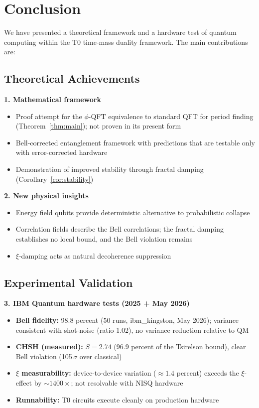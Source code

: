 \section{Conclusion}

We have presented a theoretical framework and a hardware test of quantum computing within the T0 time-mass duality framework. The main contributions are:

\subsection{Theoretical Achievements}

\textbf{1. Mathematical framework}
\begin{itemize}
	\item Proof attempt for the $\phi$-QFT equivalence to standard QFT for period finding (Theorem~\ref{thm:main}); not proven in its present form
	\item Bell-corrected entanglement framework with predictions that are testable only with error-corrected hardware
	\item Demonstration of improved stability through fractal damping (Corollary~\ref{cor:stability})
\end{itemize}

\textbf{2. New physical insights}
\begin{itemize}
	\item Energy field qubits provide deterministic alternative to probabilistic collapse
	\item Correlation fields describe the Bell correlations; the fractal damping establishes no local bound, and the Bell violation remains
	\item $\xi$-damping acts as natural decoherence suppression
\end{itemize}

\subsection{Experimental Validation}

\textbf{3. IBM Quantum hardware tests (2025 + May 2026)}
\begin{itemize}
	\item \textbf{Bell fidelity:} 98.8 percent (50 runs, ibm\_kingston, May 2026); variance consistent with shot-noise (ratio 1.02), no variance reduction relative to QM
	\item \textbf{CHSH (measured):} $S = 2.74$ (96.9 percent of the Tsirelson bound), clear Bell violation (105\,$\sigma$ over classical)
	\item \textbf{$\xi$ measurability:} device-to-device variation ($\approx 1.4$ percent) exceeds the $\xi$-effect by $\sim 1400\times$; not resolvable with NISQ hardware
	\item \textbf{Runnability:} T0 circuits execute cleanly on production hardware
\end{itemize}


